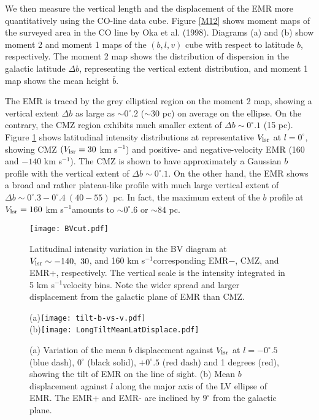 \documentclass[useAMS,usenatbib]{mn2e}
\def\kms{km s$^{-1}$}
\def\vlsr{V_{\rm lsr}}
\def\deg{^\circ}\def\Deg{^\circ}
\begin{document}
We then measure the vertical length and the displacement of the EMR more quantitatively using the CO-line data cube.
Figure \ref{M12} shows moment maps of the surveyed area in the CO line by Oka et al. (1998). Diagrams (a) and (b) show moment 2 and moment 1 maps of the $(b,l,v)$ cube with respect to latitude $b$, respectively. The moment 2 map shows the distribution of dispersion in the galactic latitude $\Delta b$, representing the vertical extent distribution, and moment 1 map shows the mean height ${\bar b}$.

The EMR is traced by the grey elliptical region on the moment 2 map, showing a vertical extent $\Delta b$ as large as $\sim 0\deg.2$ ($\sim 30$ pc) on average on the ellipse. On the contrary, the CMZ region exhibits much smaller extent of $\Delta b \sim 0\deg.1$ (15 pc). Figure \ref{BVcut} shows latitudinal intensity distributions at representative $\vlsr$ at $l=0\deg$, showing CMZ $(\vlsr=30$ \kms) and positive- and negative-velocity EMR (160 and $-140$ \kms). The CMZ is shown to have approximately a Gaussian $b$ profile with the vertical extent of $\Delta b\sim 0\deg.1$. On the other hand, the EMR shows a broad and rather plateau-like profile with much large vertical extent of $\Delta b\sim 0\deg.3-0\deg.4\ (40-55)$ pc. In fact, the maximum extent of the $b$ profile at $\vlsr=160$ \kms amounts to $\sim 0\deg.6$ or $\sim 84$ pc. 


\begin{figure} 
\begin{center} 
\texttt{[image: BVcut.pdf]} 
\end{center}
\caption{Latitudinal intensity variation in the BV diagram at $\vlsr \sim -140,\ 30$, and 160 \kms corresponding EMR$-$, CMZ, and EMR+, respectively. The vertical scale is the intensity integrated in 5 \kms velocity bins. Note the wider spread and larger displacement from the galactic plane of EMR than CMZ.}
 \label{BVcut}  
\end{figure}  
 
\begin{figure} 
\begin{center} 
\hskip -2mm(a)\texttt{[image: tilt-b-vs-v.pdf]}  \\
(b)\texttt{[image: LongTiltMeanLatDisplace.pdf]}  
\end{center}
\caption{(a) Variation of the mean $b$ displacement against $\vlsr$ at $l=-0\deg.5$ (blue dash), $0\deg$ (black solid), $+0\deg.5$ (red dash) and 1 degrees (red), showing the tilt of EMR on the line of sight.
(b) Mean $b$ displacement against $l$ along the major axis of the LV ellipse of EMR. The EMR+ and EMR- are inclined by $9\deg$ from the galactic plane.}
 \label{M1cut}  
\end{figure} 
\end{document}
